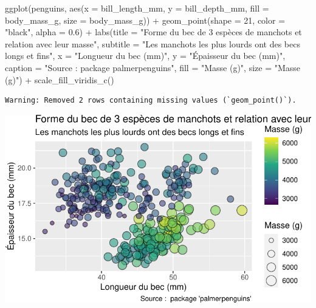 \documentclass[
  a4paper,
  DIV=11,
  numbers=noendperiod,
  oneside]{scrreprt}
\newenvironment{Shaded}{}{}
\newcommand{\AttributeTok}[1]{\textcolor[rgb]{0.84,0.23,0.29}{#1}}
\newcommand{\DecValTok}[1]{\textcolor[rgb]{0.00,0.36,0.77}{#1}}
\newcommand{\FloatTok}[1]{\textcolor[rgb]{0.00,0.36,0.77}{#1}}
\newcommand{\FunctionTok}[1]{\textcolor[rgb]{0.44,0.26,0.76}{#1}}
\newcommand{\NormalTok}[1]{\textcolor[rgb]{0.14,0.16,0.18}{#1}}
\newcommand{\SpecialCharTok}[1]{\textcolor[rgb]{0.00,0.36,0.77}{#1}}
\newcommand{\StringTok}[1]{\textcolor[rgb]{0.01,0.18,0.38}{#1}}
\begin{document}
\begin{Shaded}
\begin{Highlighting}[]
\FunctionTok{ggplot}\NormalTok{(penguins, }\FunctionTok{aes}\NormalTok{(}\AttributeTok{x =}\NormalTok{ bill\_length\_mm, }\AttributeTok{y =}\NormalTok{ bill\_depth\_mm,}
                     \AttributeTok{fill =}\NormalTok{ body\_mass\_g, }\AttributeTok{size =}\NormalTok{ body\_mass\_g)) }\SpecialCharTok{+}
  \FunctionTok{geom\_point}\NormalTok{(}\AttributeTok{shape =} \DecValTok{21}\NormalTok{, }\AttributeTok{color =} \StringTok{"black"}\NormalTok{, }\AttributeTok{alpha =} \FloatTok{0.6}\NormalTok{) }\SpecialCharTok{+}
  \FunctionTok{labs}\NormalTok{(}\AttributeTok{title =} \StringTok{"Forme du bec de 3 espèces de manchots et relation avec leur masse"}\NormalTok{,}
       \AttributeTok{subtitle =} \StringTok{"Les manchots les plus lourds ont des becs longs et fins"}\NormalTok{,}
       \AttributeTok{x =} \StringTok{"Longueur du bec (mm)"}\NormalTok{,}
       \AttributeTok{y =} \StringTok{"Épaisseur du bec (mm)"}\NormalTok{,}
       \AttributeTok{caption =} \StringTok{"Source :  package \textquotesingle{}palmerpenguins\textquotesingle{}"}\NormalTok{,}
       \AttributeTok{fill =} \StringTok{"Masse (g)"}\NormalTok{,}
       \AttributeTok{size =} \StringTok{"Masse (g)"}\NormalTok{) }\SpecialCharTok{+}
  \FunctionTok{scale\_fill\_viridis\_c}\NormalTok{()}
\end{Highlighting}
\end{Shaded}

\begin{verbatim}
Warning: Removed 2 rows containing missing values (`geom_point()`).
\end{verbatim}

\includegraphics{03-visualization_files/figure-pdf/unnamed-chunk-90-1.pdf}
\end{document}
